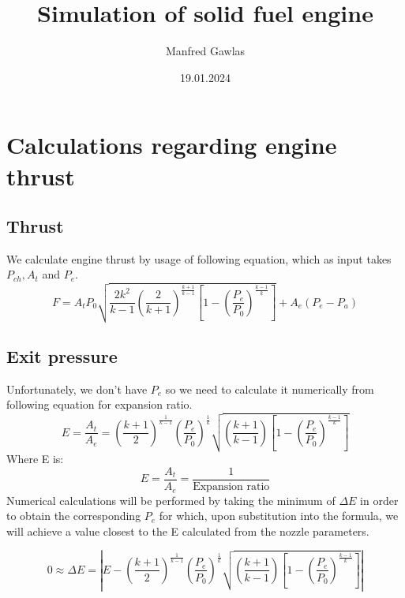 \documentclass{article}
\title{Simulation of solid fuel engine}
\author{Manfred Gawlas}
\date{19.01.2024}
\begin{document}
\maketitle

\section{Calculations regarding engine thrust}
\subsection{Thrust}
We calculate engine thrust by usage of following equation, which as input takes $P_{ch}, A_t$ and $P_e$.
\begin{equation}
F=A_tP_0\sqrt{\frac{2k^2}{k-1}\left(\frac{2}{k+1}\right)^{\frac{k+1}{k-1}}\left[1-\left(\frac{P_e}{P_0}\right)^{\frac{k-1}{k}}\right]} + A_e(P_e - P_a)
\end{equation}

\subsection{Exit pressure}
Unfortunately, we don't have $P_e$ so we need to calculate it numerically from following equation for expansion ratio.
\begin{equation}
E = \frac{A_t}{A_e}=\left(\frac{k+1}{2}\right)^{\frac{1}{k-1}}\left(\frac{P_e}{P_0}\right)^{\frac{1}{k}}\sqrt{\left(\frac{k+1}{k-1}\right)\left[1-\left(\frac{P_e}{P_0}\right)^{\frac{k-1}{k}}\right]}
\end{equation}
Where E is:
$$E = \frac{A_t}{A_e} = \frac{1}{\mbox{Expansion ratio}}$$
Numerical calculations will be performed by taking the minimum of $\Delta E$ in order to obtain the corresponding $P_e$ for which, upon substitution into the formula, we will achieve a value closest to the E calculated from the nozzle parameters.

\begin{equation}
0 \approx \Delta E = \left| E - \left(\frac{k+1}{2}\right)^{\frac{1}{k-1}}\left(\frac{P_e}{P_0}\right)^{\frac{1}{k}}\sqrt{\left(\frac{k+1}{k-1}\right)\left[1-\left(\frac{P_e}{P_0}\right)^{\frac{k-1}{k}}\right]}  \right|
\end{equation}
\end{document}
